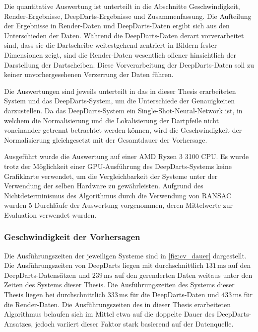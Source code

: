 Die quantitative Auswertung ist unterteilt in die Abschnitte Geschwindigkeit, Render-Ergebnisse, DeepDarts-Ergebnisse und Zusammenfassung. Die Aufteilung der Ergebnisse in Render-Daten und DeepDarts-Daten ergibt sich aus den Unterschieden der Daten. Während die DeepDarts-Daten derart vorverarbeitet sind, dass sie die Dartscheibe weitestgehend zentriert in Bildern fester Dimensionen zeigt, sind die Render-Daten wesentlich offener hinsichtlich der Darstellung der Dartscheiben. Diese Vorverarbeitung der DeepDarts-Daten soll zu keiner unvorhergesehenen Verzerrung der Daten führen.

Die Auswertungen sind jeweils unterteilt in das in dieser Thesis erarbeiteten System und das DeepDarts-System, um die Unterschiede der Genauigkeiten darzustellen. Da das DeepDarts-System ein Single-Shot-Neural-Network ist, in welchem die Normalisierung und die Lokalisierung der Dartpfeile nicht voneinander getrennt betrachtet werden können, wird die Geschwindigkeit der Normalisierung gleichgesetzt mit der Gesamtdauer der Vorhersage.

Ausgeführt wurde die Auswertung auf einer AMD Ryzen 3 3100 CPU. Es wurde trotz der Möglichkeit einer GPU-Ausführung des DeepDarts-Systems keine Grafikkarte verwendet, um die Vergleichbarkeit der Systeme unter der Verwendung der selben Hardware zu gewährleisten. Aufgrund des Nichtdeterminismus des Algorithmus durch die Verwendung von RANSAC wurden 5 Durchläufe der Auswertung vorgenommen, deren Mittelwerte zur Evaluation verwendet wurden.

\subsubsection{Geschwindigkeit der Vorhersagen} %

\ExecutionTimes

Die Ausführungszeiten der jeweiligen Systeme sind in \autoref{fig:cv_dauer} dargestellt. Die Ausführungszeiten von DeepDarts liegen mit durchschnittlich $131\,\text{ms}$ auf den DeepDarts-Datensätzen und $239\,\text{ms}$ auf den gerenderten Daten weitaus unter den Zeiten des Systems dieser Thesis. Die Ausführungszeiten des Systems dieser Thesis liegen bei durchschnittlich $333\,\text{ms}$ für die DeepDarts-Daten und $433\,\text{ms}$ für die Render-Daten. Die Ausführungszeiten des in dieser Thesis erarbeiteten Algorithmus belaufen sich im Mittel etwa auf die doppelte Dauer des DeepDarts-Ansatzes, jedoch variiert dieser Faktor stark basierend auf der Datenquelle.

